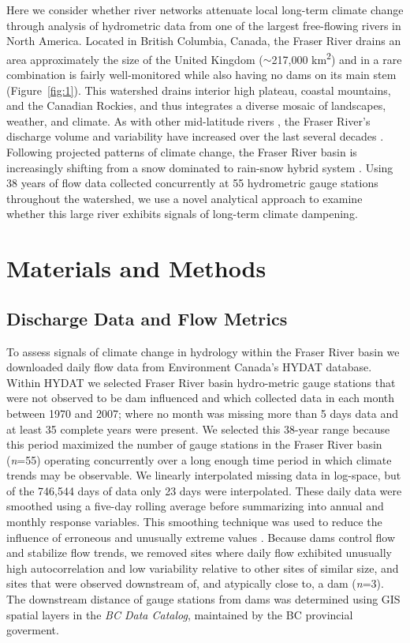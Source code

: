 \documentclass{AGUJournal}
\begin{document}
Here we consider whether river networks attenuate local long-term climate change through analysis of hydrometric data from one of the largest free-flowing rivers in North America. Located in British Columbia, Canada, the Fraser River drains an area approximately the size of the United Kingdom ($\sim$217,000 km\textsuperscript{2}) and in a rare combination is fairly well-monitored while also having no dams on its main stem \citep{Vorosmarty:2010} (Figure~\ref{fig:1}). This watershed drains interior high plateau, coastal mountains, and the Canadian Rockies, and thus integrates a diverse mosaic of landscapes, weather, and climate. As with other mid-latitude rivers \citep{Bindoff:2013}, the Fraser River's discharge volume and variability have increased over the last several decades \citep{Dery:2012,Morrison:2002}. Following projected patterns of climate change, the Fraser River basin is increasingly shifting from a snow dominated to rain-snow hybrid system \citep{Kang:2016}. Using 38 years of flow data collected concurrently at 55 hydrometric gauge stations throughout the watershed, we use a novel analytical approach to examine whether this large river exhibits signals of long-term climate dampening.

\section{Materials and Methods}

\subsection{Discharge Data and Flow Metrics}

	To assess signals of climate change in hydrology within the Fraser River basin we downloaded daily flow data from Environment Canada's HYDAT database. Within HYDAT we selected Fraser River basin hydro-metric gauge stations that were not observed to be dam influenced and which collected data in each month between 1970 and 2007; where no month was missing more than 5 days data and at least 35 complete years were present. We selected this 38-year range because this period maximized the number of gauge stations in the Fraser River basin (\textit{n}=55) operating concurrently over a long enough time period in which climate trends may be observable. We linearly interpolated missing data in log-space, but of the 746,544 days of data only 23 days were interpolated. These daily data were smoothed using a five-day rolling average before summarizing into annual and monthly response variables. This smoothing technique was used to reduce the influence of erroneous and unusually extreme values \citep [e.g.,][]{Dery:2009}. Because dams control flow and stabilize flow trends, we removed sites where daily flow exhibited unusually high autocorrelation and low variability relative to other sites of similar size, and sites that were observed downstream of, and atypically close to, a dam (\textit{n}=3). The downstream distance of gauge stations from dams was determined using GIS spatial layers in the \textit{BC Data Catalog}, maintained by the BC provincial goverment.
\end{document}
